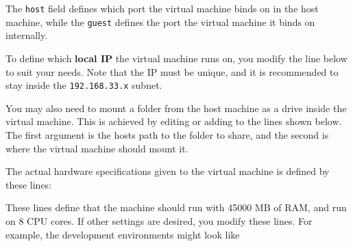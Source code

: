 The \texttt{host} field defines which port the virtual machine binds on
in the host machine, while the \texttt{guest} defines the port the
virtual machine it binds on internally.

To define which \textbf{local IP} the virtual machine runs on, you
modify the line below to suit your needs. Note that the IP must be
unique, and it is recommended to stay inside the \texttt{192.168.33.x}
subnet.

\begin{Shaded}
\begin{Highlighting}[numbers=left,,]
\end{Highlighting}
\end{Shaded}

You may also need to mount a folder from the host machine as a drive
inside the virtual machine. This is achieved by editing or adding to the
lines shown below. The first argument is the hosts path to the folder to
share, and the second is where the virtual machine should mount it.

\begin{Shaded}
\begin{Highlighting}[numbers=left,,]
\NormalTok{, }
\NormalTok{, }
\end{Highlighting}
\end{Shaded}

The actual hardware specifications given to the virtual machine is
defined by these lines:

\begin{Shaded}
\begin{Highlighting}[numbers=left,,]
  
\end{Highlighting}
\end{Shaded}

These lines define that the machine should run with 45000 MB of RAM, and
run on 8 CPU cores. If other settings are desired, you modify these
lines. For example, the development environments might look like

